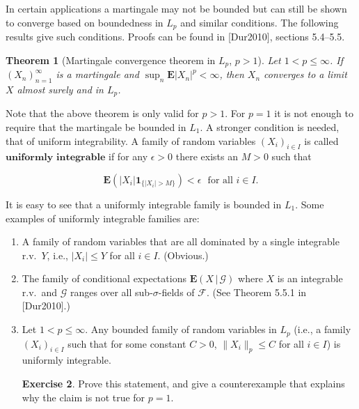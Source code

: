 \documentclass[11pt]{report}
\theoremstyle{plain}
\newtheorem{thm}{Theorem}[chapter]
\theoremstyle{definition}
\newtheorem{xexercise}[thm]{Exercise}
\begin{document}
In certain applications a martingale may not be
bounded but can still be shown to converge based on
boundedness in $L_p$ and similar conditions. The
following results give such conditions. Proofs can be
found in [Dur2010], sections 5.4--5.5.

\begin{thm}[Martingale convergence theorem in $L_p$, $p>1$]
Let $1<p\le \infty$. If $(X_n)_{n=1}^\infty$ is a
martingale and $\sup_n \mathbf{E} |X_n|^p<\infty$,
then $X_n$ converges to a limit $X$ almost surely and
in $L_p$.
\end{thm}

\noindent Note that the above theorem is only valid for $p>1$.
For $p=1$ it is not enough to require that the
martingale be bounded in $L_1$. A stronger condition
is needed, that of uniform integrability. A family of
random variables $(X_i)_{i\in I}$ is called
$\textbf{uniformly integrable}$ if for any
$\epsilon>0$ there exists an $M>0$ such that

\[
\mathbf{E}( |X_i| \mathbf{1}_{\{|X_i|>M\}} ) < \epsilon \ \ \ \textrm{for all }i\in I.
\]

\noindent It is easy to see that a uniformly integrable family
is bounded in $L_1$. Some examples of uniformly
integrable families are:

\begin{enumerate}[label=\arabic*.]
\item A family of random variables that are all dominated
by a single integrable r.v.\ $Y$, i.e., $|X_i|\le Y$
for all $i\in I$. (Obvious.)

\item The family of conditional expectations
$\mathbf{E}\left(X\,|\,\mathcal{G}\right)$ where $X$
is an integrable r.v.\ and $\mathcal{G}$ ranges over
all sub-$\sigma$-fields of $\mathcal{F}$. (See
Theorem 5.5.1 in [Dur2010].)

\item Let $1< p\le \infty$. Any bounded family of random
variables in $L_p$ (i.e., a family $(X_i)_{i\in I}$
such that for some constant $C>0$,
$\lVert X_i \rVert_p\le C$ for all $i\in I$) is
uniformly integrable.

\begin{xexercise}
Prove this statement, and give a counterexample that
explains why the claim is not true for $p=1$.
\end{xexercise}
\end{enumerate}
\end{document}
